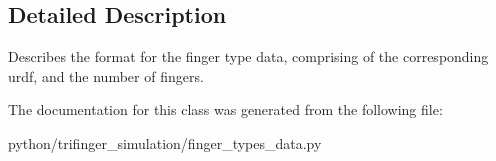 \subsection{Detailed Description}
Describes the format for the finger type data, comprising of the corresponding urdf, and the number of fingers. 

The documentation for this class was generated from the following file\+:\begin{DoxyCompactItemize}
\item 
python/trifinger\+\_\+simulation/finger\+\_\+types\+\_\+data.\+py\end{DoxyCompactItemize}
